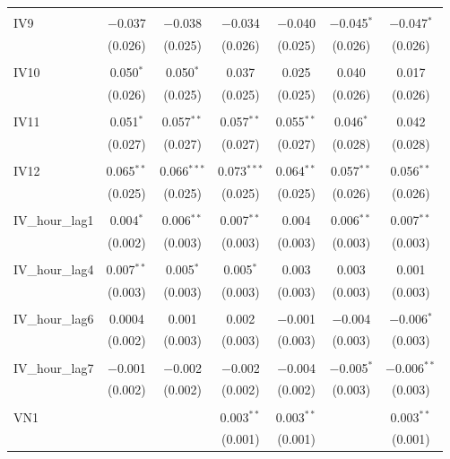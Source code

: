 \begin{table}[!htbp]
\begin{tabular}{@{\extracolsep{5pt}}lcccccc}
  & & & & & & \\ 
 IV9 & $-$0.037 & $-$0.038 & $-$0.034 & $-$0.040 & $-$0.045$^{*}$ & $-$0.047$^{*}$ \\ 
  & (0.026) & (0.025) & (0.026) & (0.025) & (0.026) & (0.026) \\ 
  & & & & & & \\ 
 IV10 & 0.050$^{*}$ & 0.050$^{*}$ & 0.037 & 0.025 & 0.040 & 0.017 \\ 
  & (0.026) & (0.025) & (0.025) & (0.025) & (0.026) & (0.026) \\ 
  & & & & & & \\ 
 IV11 & 0.051$^{*}$ & 0.057$^{**}$ & 0.057$^{**}$ & 0.055$^{**}$ & 0.046$^{*}$ & 0.042 \\ 
  & (0.027) & (0.027) & (0.027) & (0.027) & (0.028) & (0.028) \\ 
  & & & & & & \\ 
 IV12 & 0.065$^{**}$ & 0.066$^{***}$ & 0.073$^{***}$ & 0.064$^{**}$ & 0.057$^{**}$ & 0.056$^{**}$ \\ 
  & (0.025) & (0.025) & (0.025) & (0.025) & (0.026) & (0.026) \\ 
  & & & & & & \\ 
 IV\_hour\_lag1 & 0.004$^{*}$ & 0.006$^{**}$ & 0.007$^{**}$ & 0.004 & 0.006$^{**}$ & 0.007$^{**}$ \\ 
  & (0.002) & (0.003) & (0.003) & (0.003) & (0.003) & (0.003) \\ 
  & & & & & & \\ 
 IV\_hour\_lag4 & 0.007$^{**}$ & 0.005$^{*}$ & 0.005$^{*}$ & 0.003 & 0.003 & 0.001 \\ 
  & (0.003) & (0.003) & (0.003) & (0.003) & (0.003) & (0.003) \\ 
  & & & & & & \\ 
 IV\_hour\_lag6 & 0.0004 & 0.001 & 0.002 & $-$0.001 & $-$0.004 & $-$0.006$^{*}$ \\ 
  & (0.002) & (0.003) & (0.003) & (0.003) & (0.003) & (0.003) \\ 
  & & & & & & \\ 
 IV\_hour\_lag7 & $-$0.001 & $-$0.002 & $-$0.002 & $-$0.004 & $-$0.005$^{*}$ & $-$0.006$^{**}$ \\ 
  & (0.002) & (0.002) & (0.002) & (0.002) & (0.003) & (0.003) \\ 
  & & & & & & \\ 
 VN1 &  &  & 0.003$^{**}$ & 0.003$^{**}$ &  & 0.003$^{**}$ \\ 
  &  &  & (0.001) & (0.001) &  & (0.001) \\ 

\end{tabular}
\end{table}
